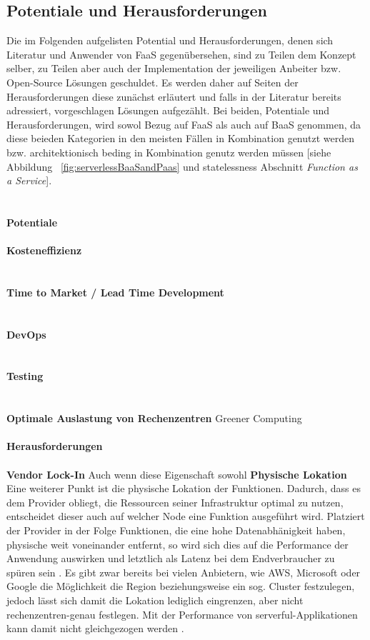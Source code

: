 \documentclass[11pt]{article}
\begin{document}
\subsection{Potentiale und Herausforderungen}
Die im Folgenden aufgelisten Potential und Herausforderungen, denen sich Literatur und Anwender von FaaS gegenübersehen, sind zu Teilen dem Konzept selber, zu Teilen aber auch der Implementation der jeweiligen Anbeiter bzw. Open-Source Lösungen geschuldet. Es werden daher auf Seiten der Herausforderungen diese zunächst erläutert und falls in der Literatur bereits adressiert, vorgeschlagen Lösungen aufgezählt. Bei beiden, Potentiale und Herausforderungen, wird sowol Bezug auf FaaS als auch auf BaaS genommen, da diese beieden Kategorien in den meisten Fällen in Kombination genutzt werden bzw. architektionisch beding in Kombination genutz werden müssen [siehe Abbildung ~\ref{fig:serverlessBaaSandPaas} und \glqq statelessness\grqq{} Abschnitt \textit{Function as a Service}]. \\\\\\
{\normalsize \textbf{Potentiale}} \\\\
\textbf{Kosteneffizienz}\\
\\\\
\textbf{Time to Market / Lead Time Development}\\
\\\\
\textbf{DevOps}\\
\\\\
\textbf{Testing}\\
\\\\
\textbf{Optimale Auslastung von Rechenzentren}
Greener Computing \cite{shafiei2020serverless} \cite{fowler2018serverless}
\\\\
{\normalsize \textbf{Herausforderungen}} \\\\
\textbf{Vendor Lock-In}
Auch wenn diese Eigenschaft sowohl 
\textbf{Physische Lokation}\\
Eine weiterer Punkt ist die physische Lokation der Funktionen. Dadurch, dass es dem Provider obliegt, die Ressourcen seiner Infrastruktur optimal zu nutzen, entscheidet dieser auch auf welcher Node eine Funktion ausgeführt wird. Platziert der Provider in der Folge Funktionen, die eine hohe Datenabhänigkeit haben, physische weit voneinander entfernt, so wird sich dies auf die Performance der Anwendung auswirken und letztlich als Latenz bei dem Endverbraucher zu spüren sein \cite{shafiei2020serverless}. Es gibt zwar bereits bei vielen Anbietern, wie AWS, Microsoft oder Google die Möglichkeit die Region beziehungsweise ein sog. Cluster festzulegen, jedoch lässt sich damit die Lokation lediglich eingrenzen, aber nicht rechenzentren-genau festlegen. Mit der Performance von \glqq serverful\grqq{}-Applikationen kann damit nicht gleichgezogen werden \cite{shafiei2020serverless}. \\\\
\end{document}
